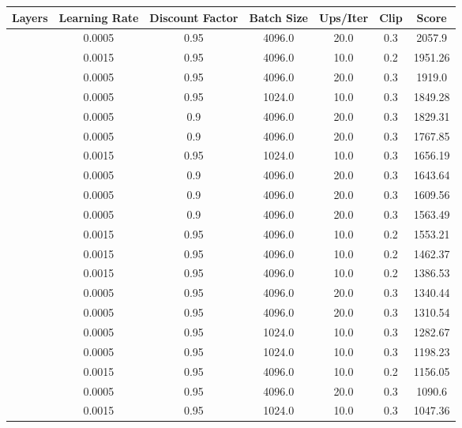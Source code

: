 \begin{table}[h]
    \centering
    \begin{tabular}{|c|c|c|c|c|c|c|}
    \hline
    Layers & Learning Rate & Discount Factor & Batch Size & Ups/Iter & Clip & Score \\
    \hline
    [32, 128, 256] & 0.0005 & 0.95 & 4096.0 & 20.0 & 0.3 & 2057.9 \\
    \hline
    [32, 128, 256] & 0.0015 & 0.95 & 4096.0 & 10.0 & 0.2 & 1951.26 \\
    \hline
    [128, 32, 256] & 0.0005 & 0.95 & 4096.0 & 20.0 & 0.3 & 1919.0 \\
    \hline
    [32, 128, 256] & 0.0005 & 0.95 & 1024.0 & 10.0 & 0.3 & 1849.28 \\
    \hline
    [128, 32, 256] & 0.0005 & 0.9 & 4096.0 & 20.0 & 0.3 & 1829.31 \\
    \hline
    [256, 128, 128] & 0.0005 & 0.9 & 4096.0 & 20.0 & 0.3 & 1767.85 \\
    \hline
    [32, 128, 256] & 0.0015 & 0.95 & 1024.0 & 10.0 & 0.3 & 1656.19 \\
    \hline
    [32, 128, 256] & 0.0005 & 0.9 & 4096.0 & 20.0 & 0.3 & 1643.64 \\
    \hline
    [128, 256, 128] & 0.0005 & 0.9 & 4096.0 & 20.0 & 0.3 & 1609.56 \\
    \hline
    [128, 256, 64] & 0.0005 & 0.9 & 4096.0 & 20.0 & 0.3 & 1563.49 \\
    \hline
    [256, 128, 128] & 0.0015 & 0.95 & 4096.0 & 10.0 & 0.2 & 1553.21 \\
    \hline
    [128, 32, 256] & 0.0015 & 0.95 & 4096.0 & 10.0 & 0.2 & 1462.37 \\
    \hline
    [128, 256, 128] & 0.0015 & 0.95 & 4096.0 & 10.0 & 0.2 & 1386.53 \\
    \hline
    [128, 256, 128] & 0.0005 & 0.95 & 4096.0 & 20.0 & 0.3 & 1340.44 \\
    \hline
    [128, 256, 64] & 0.0005 & 0.95 & 4096.0 & 20.0 & 0.3 & 1310.54 \\
    \hline
    [128, 256, 128] & 0.0005 & 0.95 & 1024.0 & 10.0 & 0.3 & 1282.67 \\
    \hline
    [256, 128, 128] & 0.0005 & 0.95 & 1024.0 & 10.0 & 0.3 & 1198.23 \\
    \hline
    [128, 256, 64] & 0.0015 & 0.95 & 4096.0 & 10.0 & 0.2 & 1156.05 \\
    \hline
    [256, 128, 128] & 0.0005 & 0.95 & 4096.0 & 20.0 & 0.3 & 1090.6 \\
    \hline
    [128, 32, 256] & 0.0015 & 0.95 & 1024.0 & 10.0 & 0.3 & 1047.36 \\

\end{tabular}
\end{table}
